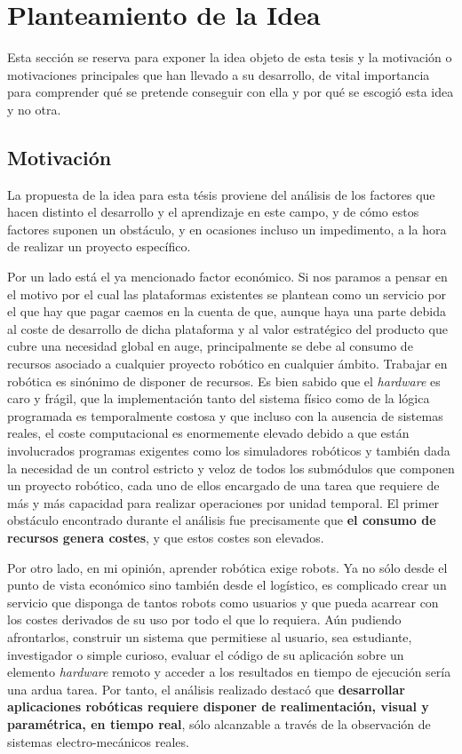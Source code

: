 \section{Planteamiento de la Idea}

Esta sección se reserva para exponer la idea objeto de esta tesis y la motivación o motivaciones principales que han llevado a su desarrollo, de vital importancia para comprender qué se pretende conseguir con ella y por qué se escogió esta idea y no otra.

\subsection{Motivación}

La propuesta de la idea para esta tésis proviene del análisis de los factores que hacen distinto el desarrollo y el aprendizaje en este campo, y de cómo estos factores suponen un obstáculo, y en ocasiones incluso un impedimento, a la hora de realizar un proyecto específico.

Por un lado está el ya mencionado factor económico. Si nos paramos a pensar en el motivo por el cual las plataformas existentes se plantean como un servicio por el que hay que pagar caemos en la cuenta de que, aunque haya una parte debida al coste de desarrollo de dicha plataforma y al valor estratégico del producto que cubre una necesidad global en auge, principalmente se debe al consumo de recursos asociado a cualquier proyecto robótico en cualquier ámbito. Trabajar en robótica es sinónimo de disponer de recursos. Es bien sabido que el \textit{hardware} es caro y frágil, que la implementación tanto del sistema físico como de la lógica programada es temporalmente costosa y que incluso con la ausencia de sistemas reales, el coste computacional es enormemente elevado debido a que están involucrados programas exigentes como los simuladores robóticos y también dada la necesidad de un control estricto y veloz de todos los submódulos que componen un proyecto robótico, cada uno de ellos encargado de una tarea que requiere de más y más capacidad para realizar operaciones por unidad temporal. El primer obstáculo encontrado durante el análisis fue precisamente que \textbf{el consumo de recursos genera costes}, y que estos costes son elevados.

Por otro lado, en mi opinión, aprender robótica exige robots. Ya no sólo desde el punto de vista económico sino también desde el logístico, es complicado crear un servicio que disponga de tantos robots como usuarios y que pueda acarrear con los costes derivados de su uso por todo el que lo requiera. Aún pudiendo afrontarlos, construir un sistema que permitiese al usuario, sea estudiante, investigador o simple curioso, evaluar el código de su aplicación sobre un elemento \textit{hardware} remoto y acceder a los resultados en tiempo de ejecución sería una ardua tarea. Por tanto, el análisis realizado destacó que \textbf{desarrollar aplicaciones robóticas requiere disponer de realimentación, visual y paramétrica, en tiempo real}, sólo alcanzable a través de la observación de sistemas electro-mecánicos reales.

